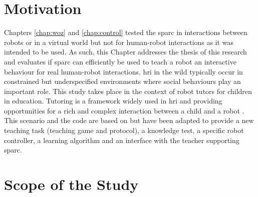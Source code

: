 \section{Motivation}

Chapters \ref{chap:woz} and \ref{chap:control} tested the \gls{sparc} in interactions between robots or in a virtual world but not for human-robot interactions as it was intended to be used. As such, this Chapter addresses the thesis of this research and evaluates if \gls{sparc} can efficiently be used to teach a robot an interactive behaviour for real human-robot interactions. \gls{hri} in the wild typically occur in constrained but underspecified environments where social behaviours play an important role.  This study takes place in the context of robot tutors for children in education. Tutoring is a framework widely used in \gls{hri} and providing opportunities for a rich and complex interaction between a child and a robot \citep{leyzberg2012physical,kennedy2015robot}. This scenario and the code are based on \cite{lemaignan2017free} but have been adapted to provide a new teaching task (teaching game and protocol), a knowledge test, a specific robot controller, a learning algorithm and an interface with the teacher supporting \gls{sparc}.


\section{Scope of the Study} \label{sec:tutoring_scope}

